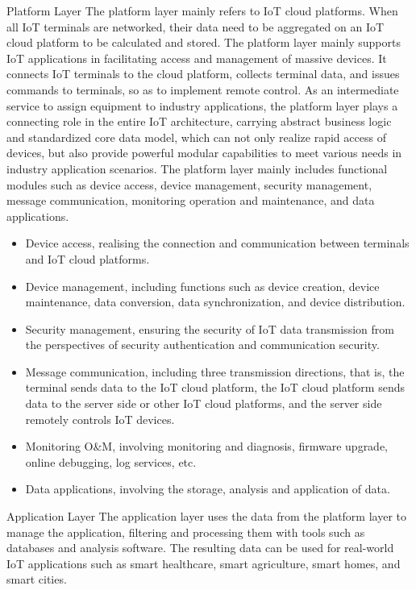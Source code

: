 \documentclass[a4paper,12pt]{book}
\begin{document}
\begin{term}{Platform Layer}
    The platform layer mainly refers to IoT cloud platforms. When all IoT terminals are networked, their data need to be aggregated on an IoT cloud platform to be calculated and stored. The platform layer mainly supports IoT applications in facilitating access and management of massive devices. It connects IoT terminals to the cloud platform, collects terminal data, and issues commands to terminals, so as to implement remote control. As an intermediate service to assign equipment to industry applications, the platform layer plays a connecting role in the entire IoT architecture, carrying abstract business logic and standardized core data model, which can not only realize rapid access of devices, but also provide powerful modular capabilities to meet various needs in industry application scenarios. The platform layer mainly includes functional modules such as device access, device management, security management, message communication, monitoring operation and maintenance, and data applications.

    \parskip 6pt
    \begin{itemize}
        \item Device access, realising the connection and communication between terminals and IoT cloud platforms.
        \parskip 0pt
        \item Device management, including functions such as device creation, device maintenance, data conversion, data synchronization, and device distribution.
        \item Security management, ensuring the security of IoT data transmission from the perspectives of security authentication and communication security.
        \item Message communication, including three transmission directions, that is, the terminal sends data to the IoT cloud platform, the IoT cloud platform sends data to the server side or other IoT cloud platforms, and the server side remotely controls IoT devices.
        \item Monitoring O\&M, involving monitoring and diagnosis, firmware upgrade, online debugging, log services, etc.
        \item Data applications, involving the storage, analysis and application of data.
    \end{itemize}
\end{term}

\begin{term}{Application Layer}
    The application layer uses the data from the platform layer to manage the application, filtering and processing them with tools such as databases and analysis software. The resulting data can be used for real-world IoT applications such as smart healthcare, smart agriculture, smart homes, and smart cities.
\end{term}
\end{document}
